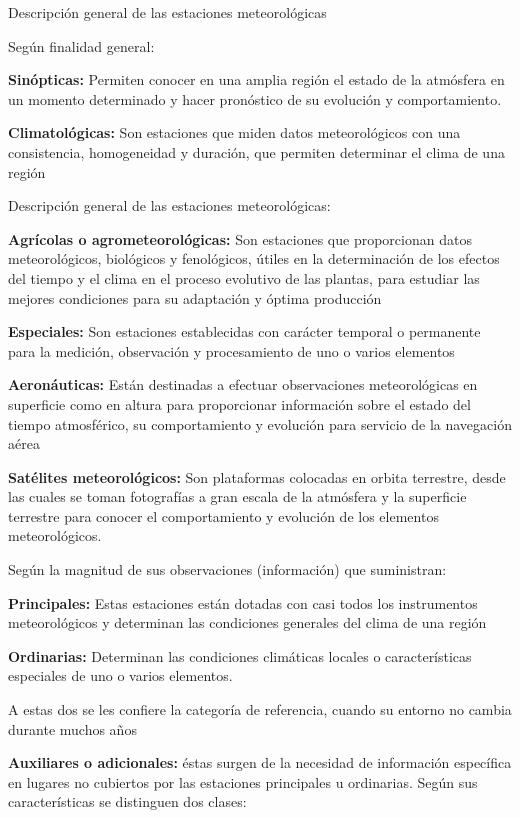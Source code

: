 Descripción general de las estaciones meteorológicas

Según finalidad general:

\textbf{Sinópticas:} Permiten conocer en una amplia región el estado de la atmósfera en un momento determinado y hacer pronóstico de su evolución y comportamiento.

\textbf{Climatológicas:} Son estaciones que miden datos meteorológicos con una consistencia, homogeneidad y duración, que permiten determinar el clima de una región

Descripción general de las estaciones meteorológicas:

\textbf{Agrícolas o agrometeorológicas:} Son estaciones que proporcionan datos meteorológicos, biológicos y fenológicos, útiles en la determinación de los efectos del tiempo y el clima en el proceso evolutivo de las plantas, para estudiar las mejores condiciones para su adaptación y óptima producción

\textbf{Especiales:} Son estaciones establecidas con carácter temporal o permanente para la medición, observación y procesamiento de uno o varios elementos

\textbf{Aeronáuticas:} Están destinadas a efectuar observaciones meteorológicas en superficie como en altura para proporcionar información sobre el estado del tiempo atmosférico, su comportamiento y evolución para servicio de la navegación aérea

\textbf{Satélites meteorológicos:} Son plataformas colocadas en orbita terrestre, desde las cuales se toman fotografías a gran escala de la atmósfera y la superficie terrestre para conocer el comportamiento y evolución de los elementos meteorológicos.

Según la magnitud de sus observaciones (información) que suministran:

\textbf{Principales:} Estas estaciones están dotadas con casi todos los instrumentos meteorológicos y determinan las condiciones generales del clima de una región

\textbf{Ordinarias:} Determinan las condiciones climáticas locales o características especiales de uno o varios elementos.

A estas dos se les confiere la categoría de referencia, cuando su entorno no cambia durante muchos años

\textbf{Auxiliares o adicionales:} éstas surgen de la necesidad de información específica en lugares no cubiertos por las estaciones principales u ordinarias. Según sus características se distinguen dos clases:

